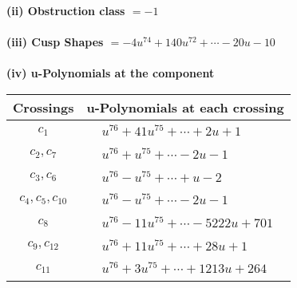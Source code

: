 \documentclass[1p]{elsarticle_modified}
\theoremstyle{definition}
\begin{document}
\flushleft \textbf{(ii) Obstruction class $= -1$}\\~\\
\flushleft \textbf{(iii) Cusp Shapes $= -4 u^{74}+140 u^{72}+\cdots-20 u-10$}\\~\\
\newpage\renewcommand{\arraystretch}{1}
\flushleft \textbf{(iv) u-Polynomials at the component}\newline \\
\begin{tabular}{m{50pt}|m{274pt}}
Crossings & \hspace{64pt}u-Polynomials at each crossing \\
\hline $$\begin{aligned}c_{1}\end{aligned}$$&$\begin{aligned}
&u^{76}+41 u^{75}+\cdots+2 u+1
\end{aligned}$\\
\hline $$\begin{aligned}c_{2},c_{7}\end{aligned}$$&$\begin{aligned}
&u^{76}+u^{75}+\cdots-2 u-1
\end{aligned}$\\
\hline $$\begin{aligned}c_{3},c_{6}\end{aligned}$$&$\begin{aligned}
&u^{76}- u^{75}+\cdots+u-2
\end{aligned}$\\
\hline $$\begin{aligned}c_{4},c_{5},c_{10}\end{aligned}$$&$\begin{aligned}
&u^{76}- u^{75}+\cdots-2 u-1
\end{aligned}$\\
\hline $$\begin{aligned}c_{8}\end{aligned}$$&$\begin{aligned}
&u^{76}-11 u^{75}+\cdots-5222 u+701
\end{aligned}$\\
\hline $$\begin{aligned}c_{9},c_{12}\end{aligned}$$&$\begin{aligned}
&u^{76}+11 u^{75}+\cdots+28 u+1
\end{aligned}$\\
\hline $$\begin{aligned}c_{11}\end{aligned}$$&$\begin{aligned}
&u^{76}+3 u^{75}+\cdots+1213 u+264
\end{aligned}$\\
\hline
\end{tabular}\\~\\
\end{document}
